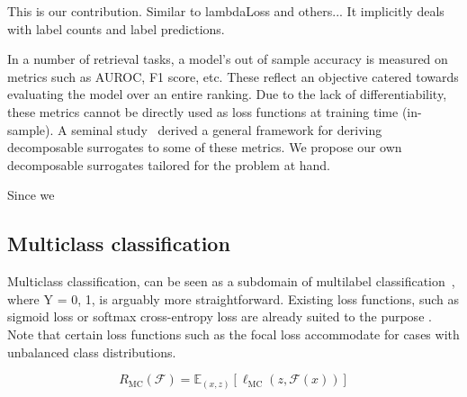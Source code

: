 This is our contribution. Similar to lambdaLoss and others... It implicitly deals with label counts and label predictions.


In a number of retrieval tasks, a model's out of sample accuracy is measured
on metrics such as AUROC, F1 score, etc. These reflect an objective catered
towards evaluating the model over an entire ranking. Due to the lack of
differentiability, these metrics cannot be directly used as loss functions at
training time (in-sample). A seminal study~\cite{optimizableLosses} derived a
general framework for deriving decomposable surrogates to some of these
metrics. We propose our own decomposable surrogates tailored for the problem
at hand.

Since we

\subsection{Multiclass classification}
\label{section:background:multiclassClassification}

Multiclass classification, can be seen as a subdomain of multilabel classification~\citep{multilabelReduction}, where Y = {0, 1}, is arguably more straightforward. Existing loss functions, such as sigmoid loss or softmax cross-entropy loss are already suited to the purpose . Note that certain loss functions such as the focal loss accommodate for cases with unbalanced class distributions. 

\begin{equation}
R_{\mathrm{MC}}(\mathcal{F}) = \mathbb{E}_{(x, z)}\left[\ell_{\mathrm{MC}}(z, \mathcal{F}(x))\right]
\end{equation}





